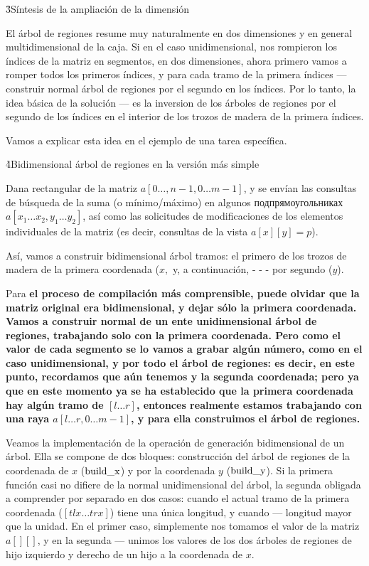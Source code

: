 \h3{Síntesis de la ampliación de la dimensión}

El árbol de regiones resume muy naturalmente en dos dimensiones y en general multidimensional de la caja. Si en el caso unidimensional, nos rompieron los índices de la matriz en segmentos, en dos dimensiones, ahora primero vamos a romper todos los primeros índices, y para cada tramo de la primera índices --- construir normal árbol de regiones por el segundo en los índices. Por lo tanto, la idea básica de la solución --- es la inversion de los árboles de regiones por el segundo de los índices en el interior de los trozos de madera de la primera índices.

Vamos a explicar esta idea en el ejemplo de una tarea específica.

\h4{Bidimensional árbol de regiones en la versión más simple}

Dana rectangular de la matriz $a[0 \ldots, n-1, 0 \ldots m-1]$, y se envían las consultas de búsqueda de la suma (o mínimo/máximo) en algunos подпрямоугольниках $a[x_1 \ldots x_2, y_1 \ldots y_2]$, así como las solicitudes de modificaciones de los elementos individuales de la matriz (es decir, consultas de la vista $a[x][y] = p$).

Así, vamos a construir bidimensional árbol tramos: el primero de los trozos de madera de la primera coordenada ($x,$ y, a continuación, - - - por segundo ($y$).

Para \bf{el proceso de compilación} más comprensible, puede olvidar que la matriz original era bidimensional, y dejar sólo la primera coordenada. Vamos a construir normal de un ente unidimensional árbol de regiones, trabajando solo con la primera coordenada. Pero como el valor de cada segmento se lo vamos a grabar algún número, como en el caso unidimensional, y por todo el árbol de regiones: es decir, en este punto, recordamos que aún tenemos y la segunda coordenada; pero ya que en este momento ya se ha establecido que la primera coordenada hay algún tramo de $[l \ldots r]$, entonces realmente estamos trabajando con una raya $a[l \ldots r, 0 \ldots m-1]$, y para ella construimos el árbol de regiones.

Veamos la implementación de la operación de generación bidimensional de un árbol. Ella se compone de dos bloques: construcción del árbol de regiones de la coordenada de $x$ ($\rm build\_x$) y por la coordenada $y$ ($\rm build\_y$). Si la primera función casi no difiere de la normal unidimensional del árbol, la segunda obligada a comprender por separado en dos casos: cuando el actual tramo de la primera coordenada ($[tlx \ldots trx]$) tiene una única longitud, y cuando --- longitud mayor que la unidad. En el primer caso, simplemente nos tomamos el valor de la matriz $a[][]$, y en la segunda --- unimos los valores de los dos árboles de regiones de hijo izquierdo y derecho de un hijo a la coordenada de $x$.

